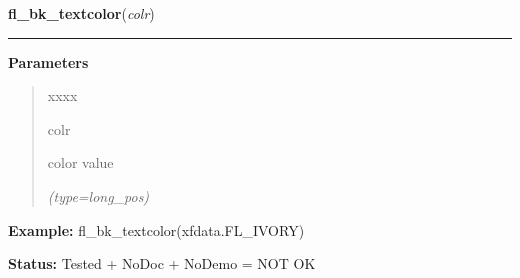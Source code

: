 \hspace{.8\funcindent}\begin{boxedminipage}{\funcwidth}

    \raggedright \textbf{fl\_bk\_textcolor}(\textit{colr})

    \vspace{-1.5ex}

    \rule{\textwidth}{0.5\fboxrule}
\setlength{\parskip}{2ex}
\setlength{\parskip}{1ex}
      \textbf{Parameters}
      \vspace{-1ex}

      \begin{quote}
        \begin{Ventry}{xxxx}

          \item[colr]

          color value

            {\it (type=long\_pos)}

        \end{Ventry}

      \end{quote}

\textbf{Example:} fl\_bk\_textcolor(xfdata.FL\_IVORY)



\textbf{Status:} Tested + NoDoc + NoDemo = NOT OK



    \end{boxedminipage}

    \label{xformslib:flbasic:fl_set_gamma}

    \vspace{0.5ex}

